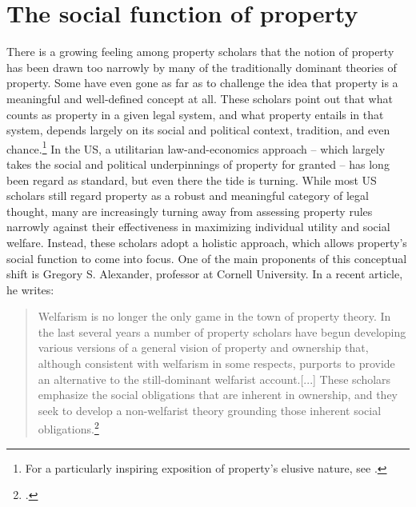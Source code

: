 \section{The social function of property}

There is a growing feeling among property scholars that the notion of property has been drawn too narrowly by many of the traditionally dominant theories of property. Some have even gone as far as to challenge the idea that property is a meaningful and well-defined concept at all. These scholars point out that what counts as property in a given legal system, and what property entails in that system, depends largely on its social and political context, tradition, and even chance.\footnote{For a particularly inspiring exposition of property's elusive nature, see \cite{gray91}.} In the US, a utilitarian law-and-economics approach -- which largely takes the social and political underpinnings of property for granted -- has long been regard as standard, but even there the tide is turning. While most US scholars still regard property as a robust and meaningful category of legal thought, many are increasingly turning away from assessing property rules narrowly against their effectiveness in maximizing individual utility and social welfare. Instead, these scholars adopt a holistic approach, which allows property's social function to come into focus. One of the main proponents of this conceptual shift is Gregory S. Alexander, professor at Cornell University. In a recent article, he writes:

\begin{quote} Welfarism is no longer the only game in the town of property theory. In the last several years a number of property scholars have begun developing various versions of a general vision of property and ownership that, although consistent with welfarism in some respects, purports to provide an alternative to the still-dominant welfarist account.[...] These scholars emphasize the social obligations that are inherent in ownership, and they seek to develop a non-welfarist theory grounding those inherent social obligations.\footcite[1017]{alexander11}
\end{quote}

